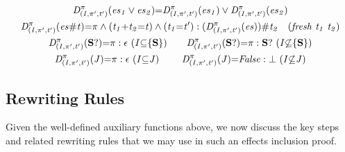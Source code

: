 \documentclass[acmsmall,10pt,review]{acmart}
\newcommand{\es}{\textcolor{black}{\ensuremath{{es}}}}
\newcommand{\choice}{\vee}
\newcommand{\code}[1]{{\tt{\ensuremath{\m{#1}}}}}
\newcommand{\empt}{\textcolor{black}{\ensuremath{\epsilon}}}
\newcommand{\bott}{\textcolor{black}{\ensuremath{\bot}}}
\newcommand{\m}{\mathit}
\begin{document}
\begin{definition}
\begin{gather*}
{    }
 \\
\code{D^{\pi}_{(I, \pi^\prime, t^\prime)}(  \es_1 \choice \es_2) } {=} \code{ D^{\pi}_{(I, \pi^\prime, t^\prime)}(  \es_1) \choice D^{\pi}_{(I, \pi^\prime, t^\prime)}(  \es_2)} 
\\
\code{D^{\pi}_{(I, \pi^\prime, t^\prime)}(  \es \# t) } {=}
\code{
\pi \wedge(t_1{+} t_2 {=}t) \wedge (t_1{=}t^\prime) : (D^{\pi}_{(I, \pi^\prime, t^\prime)}(\es))\# t_2} \ \ \ 
\code{(fresh \ t_1\ t_2 )}
\\
\code{D^{\pi}_{(I, \pi^\prime, t^\prime)}(\textbf{S}?)} {=} \code{\pi: \empt\ (}\code{ I {\subseteq} \{\textbf{S}\})}
\qquad
\code{D^{\pi}_{(I, \pi^\prime, t^\prime)}(\textbf{S}?)} {=} \code{\pi: \textbf{S}?\ (}\code{ I {\not\subseteq} \{\textbf{S}\})}
\\
\code{D^{\pi}_{(I, \pi^\prime, t^\prime)}(J)} {=} \code{\pi: \empt\ (}\code{ I {\subseteq} J)}
\qquad\ 
    \code{D^{\pi}_{(I, \pi^\prime, t^\prime)}( J)} {=} \code{False : \bott \ (}\code{I {\not\subseteq} J)} 
\end{gather*}
\end{definition}




\subsection{Rewriting Rules}
\label{InferenceRules}
Given the well-defined auxiliary functions above, we now discuss the key steps and related rewriting rules that we may use in such an effects inclusion proof.  
\end{document}
